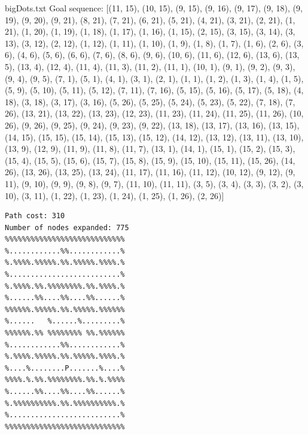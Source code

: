 \begin{multicols*}{2}
\begin{Verbatim}[samepage=true]
\end{Verbatim}
bigDots.txt
Goal sequence:
[(11, 15), (10, 15), (9, 15), (9, 16), (9, 17), (9, 18), (9, 19), (9, 20), (9, 21), (8, 21), (7, 21), (6, 21), (5, 21), (4, 21), (3, 21), (2, 21), (1, 21), (1, 20), (1, 19), (1, 18), (1, 17), (1, 16), (1, 15), (2, 15), (3, 15), (3, 14), (3, 13), (3, 12), (2, 12), (1, 12), (1, 11), (1, 10), (1, 9), (1, 8), (1, 7), (1, 6), (2, 6), (3, 6), (4, 6), (5, 6), (6, 6), (7, 6), (8, 6), (9, 6), (10, 6), (11, 6), (12, 6), (13, 6), (13, 5), (13, 4), (12, 4), (11, 4), (11, 3), (11, 2), (11, 1), (10, 1), (9, 1), (9, 2), (9, 3), (9, 4), (9, 5), (7, 1), (5, 1), (4, 1), (3, 1), (2, 1), (1, 1), (1, 2), (1, 3), (1, 4), (1, 5), (5, 9), (5, 10), (5, 11), (5, 12), (7, 11), (7, 16), (5, 15), (5, 16), (5, 17), (5, 18), (4, 18), (3, 18), (3, 17), (3, 16), (5, 26), (5, 25), (5, 24), (5, 23), (5, 22), (7, 18), (7, 26), (13, 21), (13, 22), (13, 23), (12, 23), (11, 23), (11, 24), (11, 25), (11, 26), (10, 26), (9, 26), (9, 25), (9, 24), (9, 23), (9, 22), (13, 18), (13, 17), (13, 16), (13, 15), (14, 15), (15, 15), (15, 14), (15, 13), (15, 12), (14, 12), (13, 12), (13, 11), (13, 10), (13, 9), (12, 9), (11, 9), (11, 8), (11, 7), (13, 1), (14, 1), (15, 1), (15, 2), (15, 3), (15, 4), (15, 5), (15, 6), (15, 7), (15, 8), (15, 9), (15, 10), (15, 11), (15, 26), (14, 26), (13, 26), (13, 25), (13, 24), (11, 17), (11, 16), (11, 12), (10, 12), (9, 12), (9, 11), (9, 10), (9, 9), (9, 8), (9, 7), (11, 10), (11, 11), (3, 5), (3, 4), (3, 3), (3, 2), (3, 10), (3, 11), (1, 22), (1, 23), (1, 24), (1, 25), (1, 26), (2, 26)]
\columnbreak
\begin{Verbatim}[samepage=true]
Path cost: 310
Number of nodes expanded: 775
%%%%%%%%%%%%%%%%%%%%%%%%%%%%
%............%%............%
%.%%%%.%%%%%.%%.%%%%%.%%%%.%
%..........................%
%.%%%%.%%.%%%%%%%%.%%.%%%%.%
%......%%....%%....%%......%
%%%%%%.%%%%%.%%.%%%%%.%%%%%%
%......   %......%.........%
%%%%%%.%% %%%%%%%% %%.%%%%%%
%............%%............%
%.%%%%.%%%%%.%%.%%%%%.%%%%.%
%....%........P.......%....%
%%%%.%.%%.%%%%%%%%.%%.%.%%%%
%......%%....%%....%%......%
%.%%%%%%%%%%.%%.%%%%%%%%%%.%
%..........................%
%%%%%%%%%%%%%%%%%%%%%%%%%%%%
\end{Verbatim}

\end{multicols*}
